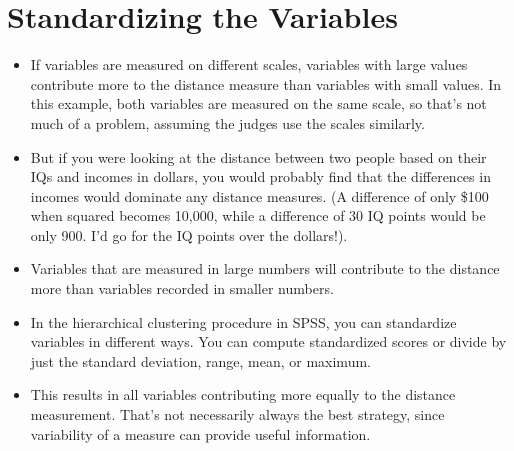 \documentclass[]{report}
\begin{document}
\section*{Standardizing the Variables}
\begin{itemize}
	\item If variables are measured on different scales, variables with large values contribute
	more to the distance measure than variables with small values. In this example, both
	variables are measured on the same scale, so that’s not much of a problem, assuming
	the judges use the scales similarly. 
	\item But if you were looking at the distance between two
	people based on their IQs and incomes in dollars, you would probably find that the
	differences in incomes would dominate any distance measures. (A difference of only
	\$100 when squared becomes 10,000, while a difference of 30 IQ points would be only
	900. I’d go for the IQ points over the dollars!).
	
	\item Variables that are measured in large numbers will contribute to the distance more than variables recorded in smaller
	numbers.
	
	\item In the hierarchical clustering procedure in SPSS, you can standardize variables in
	different ways. You can compute standardized scores or divide by just the standard
	deviation, range, mean, or maximum. 
	\item This results in all variables contributing more
	equally to the distance measurement. That’s not necessarily always the best strategy,
	since variability of a measure can provide useful information. 
\end{itemize}
\end{document}

